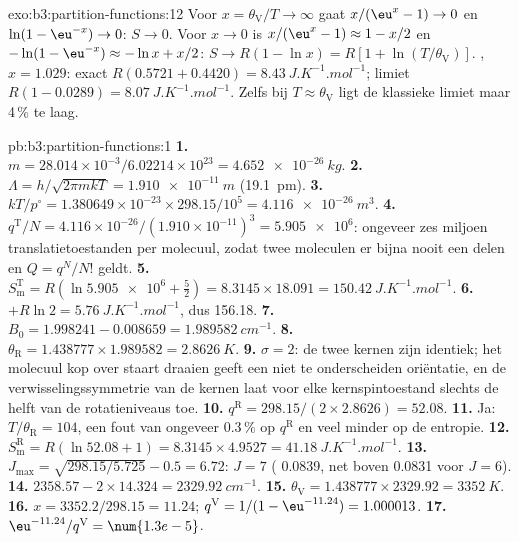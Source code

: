 \begin{solution}{exo:b3:partition-functions:12}
Voor $x = \theta_{\mathrm V}/T \to \infty$ gaat $x/(\eu^x - 1) \to 0$ en $\ln(1 - \eu^{-x}) \to 0$: $S \to 0$. Voor $x \to 0$
is
$x/(\eu^x - 1) \approx 1 - x/2$ en $-\ln(1 - \eu^{-x}) \approx -\ln x + x/2$: $S \to R(1 - \ln x) = R[1 + \ln(T/\theta_{\mathrm V})]$.
, $x = 1.029$: exact $R(0.5721 + 0.4420) = \qty{8.43}{J.K^{-1}.mol^{-1}}$; limiet $R(1 - 0.0289) =
\qty{8.07}{J.K^{-1}.mol^{-1}}$. Zelfs bij $T \approx \theta_{\mathrm V}$ ligt de
klassieke limiet maar 4\,\% te laag.
\end{solution}

\begin{solution}{pb:b3:partition-functions:1}
\textbf{1.} $m = 28.014\times10^{-3}/6.02214\times10^{23} = \qty{4.652e-26}{kg}$.
\textbf{2.} $\Lambda = h/\sqrt{2\pi mkT} = \qty{1.910e-11}{m}$ (\qty{19.1}{pm}).
\textbf{3.} $kT/p^\circ = 1.380649\times10^{-23} \times 298.15/10^5 = \qty{4.116e-26}{m^3}$.
\textbf{4.} $q^{\mathrm T}/N = 4.116\times10^{-26}/(1.910\times10^{-11})^3 = \num{5.905e6}$: ongeveer zes
miljoen translatietoestanden per molecuul, zodat twee moleculen er bijna
nooit een delen en $Q = q^N/N!$ geldt.
\textbf{5.} $S^{\mathrm T}_{\mathrm m} = R(\ln\num{5.905e6} + \frac52) = 8.3145 \times 18.091 = \qty{150.42}{J.K^{-1}.mol^{-1}}$.
\textbf{6.} $+R\ln2 = \qty{5.76}{J.K^{-1}.mol^{-1}}$, dus \num{156.18}.
\textbf{7.} $B_0 = 1.998241 - 0.008659 = \qty{1.989582}{cm^{-1}}$.
\textbf{8.} $\theta_{\mathrm R} = 1.438777 \times 1.989582 = \qty{2.8626}{K}$.
\textbf{9.} $\sigma = 2$: de twee kernen zijn identiek; het molecuul kop
over staart draaien geeft een niet te onderscheiden oriëntatie, en de
verwisselingssymmetrie van de kernen laat voor elke kernspintoestand
slechts de helft van de rotatieniveaus toe.
\textbf{10.} $q^{\mathrm R} = 298.15/(2 \times 2.8626) = 52.08$.
\textbf{11.} Ja: $T/\theta_{\mathrm R} = 104$, een fout van ongeveer 0.3\,\%
op $q^{\mathrm R}$ en veel minder op de entropie.
\textbf{12.} $S^{\mathrm R}_{\mathrm m} = R(\ln52.08 + 1) = 8.3145 \times 4.9527 = \qty{41.18}{J.K^{-1}.mol^{-1}}$.
\textbf{13.} $J_{\max} = \sqrt{298.15/5.725} - 0.5 = 6.72$: $J = 7$ (
0.0839, net boven
0.0831 voor $J = 6$).
\textbf{14.} $2358.57 - 2 \times 14.324 = \qty{2329.92}{cm^{-1}}$.
\textbf{15.} $\theta_{\mathrm V} = 1.438777 \times 2329.92 = \qty{3352}{K}$.
\textbf{16.} $x = 3352.2/298.15 = 11.24$; $q^{\mathrm V} = 1/(1 - \eu^{-11.24}) = 1.000013$.
\textbf{17.} $\eu^{-11.24}/q^{\mathrm V} = \num{1.3e-5}$.

\end{solution}
